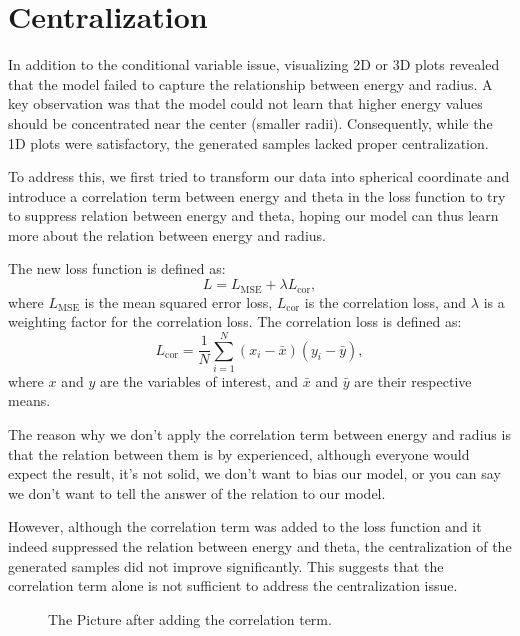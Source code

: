 \section{Centralization}
In addition to the conditional variable issue, visualizing 2D or 3D plots revealed that the model failed to capture the relationship between energy and radius. A key observation was that the model could not learn that higher energy values should be concentrated near the center (smaller radii). Consequently, while the 1D plots were satisfactory, the generated samples lacked proper centralization.

To address this, we first tried to transform our data into spherical coordinate and introduce a correlation term between energy and theta in the loss function to try to suppress relation between energy and theta, hoping our model can thus learn more about the relation between energy and radius. 

The new loss function is defined as:
\begin{equation}
    L = L_{\text{MSE}} + \lambda L_{\text{cor}},
\end{equation}
where $L_{\text{MSE}}$ is the mean squared error loss, $L_{\text{cor}}$ is the correlation loss, and $\lambda$ is a weighting factor for the correlation loss. The correlation loss is defined as:
\begin{equation}
    L_{\text{cor}} = \frac{1}{N} \sum_{i=1}^{N} (x_i - \bar{x})(y_i - \bar{y}),
\end{equation}
where $x$ and $y$ are the variables of interest, and $\bar{x}$ and $\bar{y}$ are their respective means.

The reason why we don't apply the correlation term between energy and radius is that the relation between them is by experienced, although everyone would expect the result, it's not solid, we don't want to bias our model, or you can say we don't want to tell the answer of the relation to our model. 

However, although the correlation term was added to the loss function and it indeed suppressed the relation between energy and theta, the centralization of the generated samples did not improve significantly. This suggests that the correlation term alone is not sufficient to address the centralization issue.

\begin{figure}[h!]
    \centering
    \caption{The Picture after adding the correlation term.}
\end{figure}





